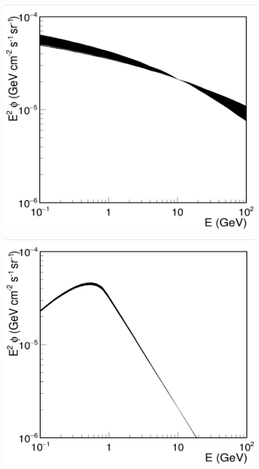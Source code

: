 \begin{figure}[h]
  \centering
  \begin{minipage}[h]{0.45\textwidth}
  	\centering
	\includegraphics[trim={0 0cm 0 0.2cm}, clip, width=1.\linewidth]{pic/method/IC_variations.png}
 	\label{fig:IC_variations}
  \end{minipage}
  \hfill
  \begin{minipage}[h]{0.45\textwidth}
	  \centering
	  \includegraphics[trim={0 0cm 0 0.2cm}, clip, width=1.\linewidth]{pic/method/BR_variations.png}
	  \label{fig:BR_variations}
  \end{minipage}
  \caption{}
  \label{fig:IC_BR_variations} 
\end{figure}



